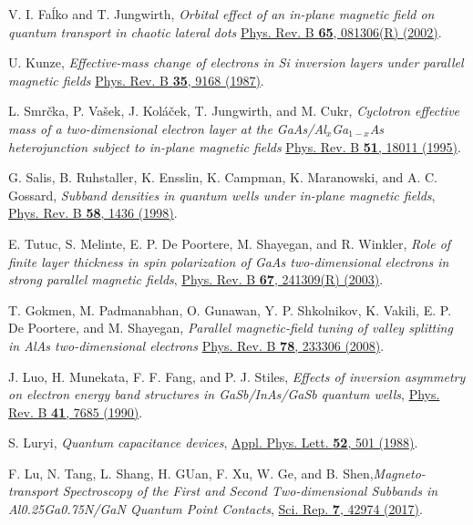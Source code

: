 \documentclass[aps,floatfix,twocolumn,showpacs,10pt,nofootinbib]{revtex4-1}
\begin{document}
\begin{thebibliography}{99}
V. I. Fa\'{l}ko and T. Jungwirth, \textit{Orbital effect of an in-plane magnetic field on quantum transport in chaotic lateral dots}
\href{http://dx.doi.org/10.1103/PhysRevB.65.081306}{Phys. Rev. B \textbf{65}, 081306(R) (2002)}.

U. Kunze, \textit{Effective-mass change of electrons in Si inversion layers under parallel magnetic fields}
\href{http://dx.doi.org/10.1103/PhysRevB.35.9168}{Phys. Rev. B \textbf{35}, 9168 (1987)}.

L. Smr\v{c}ka, P. Va\v{s}ek, J. Kol\'{a}\v{c}ek, T. Jungwirth, and M. Cukr,
\textit{Cyclotron effective mass of a two-dimensional electron layer at the GaAs/Al$_{x}$Ga$_{1-x}$As heterojunction subject to in-plane magnetic fields}
\href{http://dx.doi.org/10.1103/PhysRevB.51.18011}{Phys. Rev. B \textbf{51}, 18011 (1995)}.

G. Salis, B. Ruhstaller, K. Ensslin, K. Campman, K. Maranowski, and A. C. Gossard,
\textit{Subband densities in quantum wells under in-plane magnetic fields},
\href{http://dx.doi.org/10.1103/PhysRevB.58.1436}{Phys. Rev. B \textbf{58}, 1436 (1998)}.

E. Tutuc, S. Melinte, E. P. De Poortere,  M. Shayegan, and R. Winkler,
\textit{Role of finite layer thickness in spin polarization of GaAs two-dimensional electrons in
strong parallel magnetic fields},
\href{http://dx.doi.org/10.1103/PhysRevB.67.241309}{Phys. Rev. B \textbf{67}, 241309(R) (2003)}.

T. Gokmen, M. Padmanabhan, O. Gunawan, Y. P. Shkolnikov, K. Vakili, E. P. De Poortere, and M. Shayegan,
\textit{Parallel magnetic-field tuning of valley splitting in AlAs two-dimensional electrons}
\href{http://dx.doi.org/10.1103/PhysRevB.78.233306}{Phys. Rev. B \textbf{78}, 233306 (2008)}.

J. Luo, H. Munekata, F. F. Fang, and P. J. Stiles, \textit{Effects of inversion asymmetry on electron energy band structures in GaSb/InAs/GaSb quantum wells},
\href{https://doi.org/10.1103/PhysRevB.41.7685}{Phys. Rev. B \textbf{41}, 7685 (1990)}.

S. Luryi, \textit{Quantum capacitance devices},
\href{http://dx.doi.org/10.1063/1.99649}{Appl. Phys. Lett. \textbf{52}, 501 (1988)}.

F. Lu, N. Tang, L. Shang, H. GUan, F. Xu, W. Ge, and B. Shen,\textit{Magneto-transport Spectroscopy of the First and Second Two-dimensional Subbands in Al0.25Ga0.75N/GaN Quantum Point Contacts},
\href{http://dx.doi.org/10.1038/srep42974}{Sci. Rep. \textbf{7}, 42974 (2017)}.


\end{thebibliography}
\end{document}
